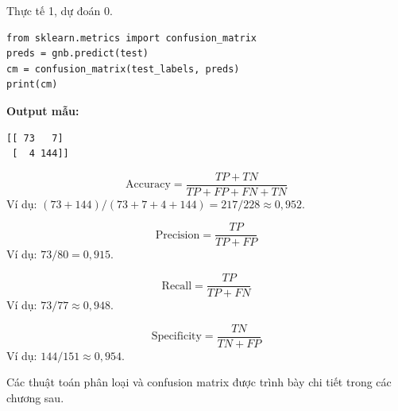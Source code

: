 \begin{tinhchat}[title={False Negative (FN)}]
Thực tế 1, dự đoán 0.
\end{tinhchat}

\begin{vidu}[title={Confusion matrix với sklearn}]
\begin{lstlisting}
from sklearn.metrics import confusion_matrix
preds = gnb.predict(test)
cm = confusion_matrix(test_labels, preds)
print(cm)
\end{lstlisting}
\textbf{Output mẫu:}
\begin{verbatim}
[[ 73   7]
 [  4 144]]
\end{verbatim}
\end{vidu}

\begin{tinhchat}[title={Accuracy}]
\[
\mathrm{Accuracy}=\frac{TP+TN}{TP+FP+FN+TN}
\]
Ví dụ: $(73+144)/(73+7+4+144)=217/228\approx 0{,}952$.
\end{tinhchat}

\begin{tinhchat}[title={Precision}]
\[
\mathrm{Precision}=\frac{TP}{TP+FP}
\]
Ví dụ: $73/80=0{,}915$.
\end{tinhchat}

\begin{tinhchat}[title={Recall (Sensitivity)}]
\[
\mathrm{Recall}=\frac{TP}{TP+FN}
\]
Ví dụ: $73/77\approx 0{,}948$.
\end{tinhchat}

\begin{tinhchat}[title={Specificity}]
\[
\mathrm{Specificity}=\frac{TN}{TN+FP}
\]
Ví dụ: $144/151\approx 0{,}954$.
\end{tinhchat}

\begin{ynghia}[title={Chương tiếp theo}]
Các thuật toán phân loại và confusion matrix được trình bày chi tiết trong các chương sau.
\end{ynghia}
